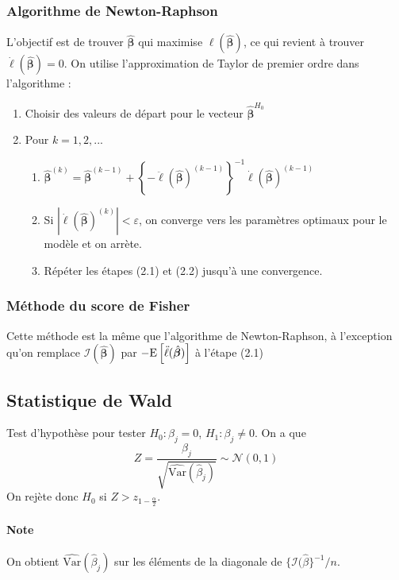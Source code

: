 \documentclass[10pt, french]{article}
\begin{document}
\begin{multicols*}{3}
\subsubsection*{Algorithme de Newton-Raphson}
L'objectif est de trouver $\hat{\bm{\beta}}$ qui maximise $\ell(\hat{\bm{\beta}})$, ce qui revient à trouver $\dot{\ell}(\hat{\bm{\beta}}) = 0$. On utilise l'approximation de Taylor de premier ordre dans l'algorithme : 
\begin{enumerate}[label = (\arabic*)]
\item Choisir des valeurs de départ pour le vecteur $\hat{\bm{\beta}}^{H_0}$
\item Pour $k = 1, 2, ...$
\begin{enumerate}[label = (2.\arabic*)]
	\item $\hat{\bm{\beta}}^{(k)} = \hat{\bm{\beta}}^{(k-1)} +  \left \{ - \ddot{\ell}(\hat{\bm{\beta}})^{(k-1)} \right \}^{-1} \dot{\ell}(\hat{\bm{\beta}})^{(k-1)}$
	\item Si $|\dot{\ell}(\hat{\bm{\beta}})^{(k)}| < \varepsilon $, on converge vers les paramètres optimaux pour le modèle et on arrète.
	\item Répéter les étapes (2.1) et (2.2) jusqu'à une convergence.
\end{enumerate}
\end{enumerate}

\subsubsection*{Méthode du score de Fisher}
Cette méthode est la même que l'algorithme de Newton-Raphson, à l'exception qu'on remplace $\mathcal{I} \left( \hat{\bm{\beta}} \right)$ par $- \mathrm{E} \left[ \ddot{\ell}(\hat{\bm{\beta}}) \right]$ à l'étape (2.1)

\subsection*{Statistique de Wald}
Test d'hypothèse pour tester $H_0 : \beta_j = 0$, $H_1 : \beta_j \neq 0$. On a que
\[Z = \frac{\beta_j}{\sqrt{\hat{\mathrm{Var}}(\hat{\beta}_j)}} \sim \mathcal{N}(0,1) \]
On rejète donc $H_0$ si $Z > z_{1 - \frac{\alpha}{2}}$.

\paragraph{Note} On obtient $\hat{\mathrm{Var}}(\hat{\beta}_j)$ sur les éléments de la diagonale de $\{ \mathcal{I}(\hat{\beta} \}^{-1} / n$.


\end{multicols*}
\end{document}
